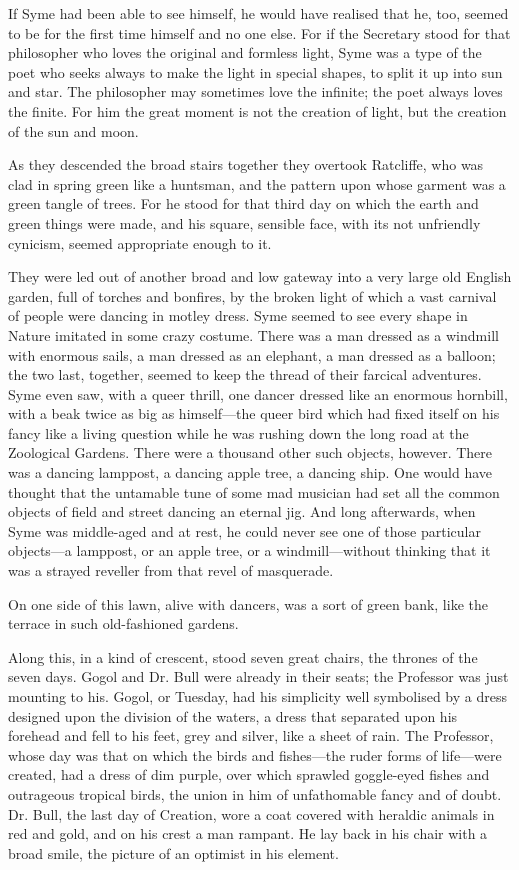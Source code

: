 If Syme had been able to see himself, he would have realised that he, too, seemed to be for the first time himself and no one else. For if the Secretary stood for that philosopher who loves the original and formless light, Syme was a type of the poet who seeks always to make the light in special shapes, to split it up into sun and star. The philosopher may sometimes love the infinite; the poet always loves the finite. For him the great moment is not the creation of light, but the creation of the sun and moon.

As they descended the broad stairs together they overtook Ratcliffe, who was clad in spring green like a huntsman, and the pattern upon whose garment was a green tangle of trees. For he stood for that third day on which the earth and green things were made, and his square, sensible face, with its not unfriendly cynicism, seemed appropriate enough to it.

They were led out of another broad and low gateway into a very large old English garden, full of torches and bonfires, by the broken light of which a vast carnival of people were dancing in motley dress. Syme seemed to see every shape in Nature imitated in some crazy costume. There was a man dressed as a windmill with enormous sails, a man dressed as an elephant, a man dressed as a balloon; the two last, together, seemed to keep the thread of their farcical adventures. Syme even saw, with a queer thrill, one dancer dressed like an enormous hornbill, with a beak twice as big as himself⁠—the queer bird which had fixed itself on his fancy like a living question while he was rushing down the long road at the Zoological Gardens. There were a thousand other such objects, however. There was a dancing lamppost, a dancing apple tree, a dancing ship. One would have thought that the untamable tune of some mad musician had set all the common objects of field and street dancing an eternal jig. And long afterwards, when Syme was middle-aged and at rest, he could never see one of those particular objects⁠—a lamppost, or an apple tree, or a windmill⁠—without thinking that it was a strayed reveller from that revel of masquerade.

On one side of this lawn, alive with dancers, was a sort of green bank, like the terrace in such old-fashioned gardens.

Along this, in a kind of crescent, stood seven great chairs, the thrones of the seven days. Gogol and Dr. Bull were already in their seats; the Professor was just mounting to his. Gogol, or Tuesday, had his simplicity well symbolised by a dress designed upon the division of the waters, a dress that separated upon his forehead and fell to his feet, grey and silver, like a sheet of rain. The Professor, whose day was that on which the birds and fishes⁠—the ruder forms of life⁠—were created, had a dress of dim purple, over which sprawled goggle-eyed fishes and outrageous tropical birds, the union in him of unfathomable fancy and of doubt. Dr. Bull, the last day of Creation, wore a coat covered with heraldic animals in red and gold, and on his crest a man rampant. He lay back in his chair with a broad smile, the picture of an optimist in his element.

